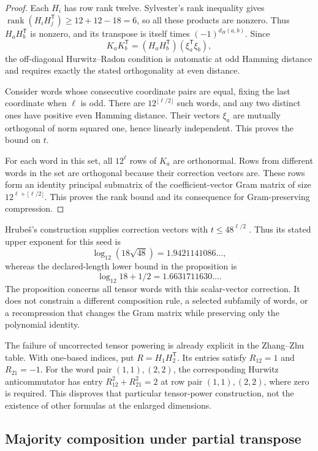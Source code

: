 \begin{proof}
Each $H_i$ has row rank twelve. Sylvester's rank inequality gives
$\operatorname{rank}(H_iH_j^{\mathsf T})\ge12+12-18=6$,
so all these products are nonzero. Thus
$H_aH_b^{\mathsf T}$ is nonzero, and its transpose is itself times
$(-1)^{d_H(a,b)}$. Since
\[
 K_aK_b^{\mathsf T}
   =(H_aH_b^{\mathsf T})(\xi_a^{\mathsf T}\xi_b),
\]
the off-diagonal Hurwitz--Radon condition is automatic at odd
Hamming distance and requires exactly the stated orthogonality at
even distance.

Consider words whose consecutive coordinate pairs are equal, fixing
the last coordinate when $\ell$ is odd. There are
$12^{\lfloor\ell/2\rfloor}$ such words, and any two distinct ones have
positive even Hamming distance. Their vectors $\xi_a$ are mutually
orthogonal of norm squared one, hence linearly independent. This
proves the bound on $t$.

For each word in this set, all $12^\ell$ rows of $K_a$ are
orthonormal. Rows from different words in the set are orthogonal
because their correction vectors are. These rows form an identity
principal submatrix of the coefficient-vector Gram matrix of size
$12^{\ell+\lfloor\ell/2\rfloor}$. This proves the rank bound and its
consequence for Gram-preserving compression.
\end{proof}

Hrube\v{s}'s construction supplies correction vectors with
$t\le48^{\ell/2}$ \cite[Section~5.2, p.~12]{Hrubes2026}. Thus its
stated upper exponent for this seed is
\[
 \log_{12}(18\sqrt{48})=1.9421141086\ldots,
\]
whereas the declared-length lower bound in the proposition is
\[
 \log_{12}18+1/2=1.6631711630\ldots.
\]
The proposition concerns all tensor words with this scalar-vector
correction. It does not constrain a different composition rule,
a selected subfamily of words, or a recompression that changes the
Gram matrix while preserving only the polynomial identity.

The failure of uncorrected tensor powering is already explicit in
the Zhang--Zhu table. With one-based indices, put
$R=H_1H_2^{\mathsf T}$. Its entries satisfy $R_{12}=1$ and
$R_{21}=-1$. For the word pair $(1,1),(2,2)$, the corresponding
Hurwitz anticommutator has entry
$R_{12}^2+R_{21}^2=2$ at row pair $(1,1),(2,2)$, where zero is
required. This disproves that particular tensor-power construction,
not the existence of other formulas at the enlarged dimensions.

\subsection{Majority composition under partial transpose}

